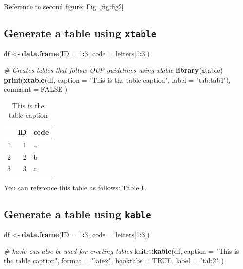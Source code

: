 \documentclass[12pt,halfline,a4paper,]{ouparticle}
\newenvironment{Shaded}{\begin{snugshade}}{\end{snugshade}}
\newcommand{\AttributeTok}[1]{\textcolor[rgb]{0.13,0.29,0.53}{#1}}
\newcommand{\CommentTok}[1]{\textcolor[rgb]{0.56,0.35,0.01}{\textit{#1}}}
\newcommand{\ConstantTok}[1]{\textcolor[rgb]{0.56,0.35,0.01}{#1}}
\newcommand{\DecValTok}[1]{\textcolor[rgb]{0.00,0.00,0.81}{#1}}
\newcommand{\FunctionTok}[1]{\textcolor[rgb]{0.13,0.29,0.53}{\textbf{#1}}}
\newcommand{\NormalTok}[1]{#1}
\newcommand{\OtherTok}[1]{\textcolor[rgb]{0.56,0.35,0.01}{#1}}
\newcommand{\SpecialCharTok}[1]{\textcolor[rgb]{0.81,0.36,0.00}{\textbf{#1}}}
\newcommand{\StringTok}[1]{\textcolor[rgb]{0.31,0.60,0.02}{#1}}
\begin{document}
Reference to second figure: Fig. \ref{fig:fig2}

\subsection{\texorpdfstring{Generate a table using
\texttt{xtable}}{Generate a table using xtable}}\label{generate-a-table-using-xtable}

\begin{Shaded}
\begin{Highlighting}[]
\NormalTok{df }\OtherTok{\textless{}{-}} \FunctionTok{data.frame}\NormalTok{(}\AttributeTok{ID =} \DecValTok{1}\SpecialCharTok{:}\DecValTok{3}\NormalTok{, }\AttributeTok{code =}\NormalTok{ letters[}\DecValTok{1}\SpecialCharTok{:}\DecValTok{3}\NormalTok{])}

\CommentTok{\# Creates tables that follow OUP guidelines using xtable}
\FunctionTok{library}\NormalTok{(xtable)}
\FunctionTok{print}\NormalTok{(}\FunctionTok{xtable}\NormalTok{(df, }\AttributeTok{caption =} \StringTok{"This is the table caption"}\NormalTok{, }\AttributeTok{label =} \StringTok{"tab:tab1"}\NormalTok{),}
  \AttributeTok{comment =} \ConstantTok{FALSE}
\NormalTok{)}
\end{Highlighting}
\end{Shaded}

\begin{table}[ht]
\centering
\begin{tabular}{rrl}
  \hline
 & ID & code \\ 
  \hline
1 &   1 & a \\ 
  2 &   2 & b \\ 
  3 &   3 & c \\ 
   \hline
\end{tabular}
\caption{This is the table caption} 
\label{tab:tab1}
\end{table}

You can reference this table as follows: Table \ref{tab:tab1}.

\subsection{\texorpdfstring{Generate a table using
\texttt{kable}}{Generate a table using kable}}\label{generate-a-table-using-kable}

\begin{Shaded}
\begin{Highlighting}[]
\NormalTok{df }\OtherTok{\textless{}{-}} \FunctionTok{data.frame}\NormalTok{(}\AttributeTok{ID =} \DecValTok{1}\SpecialCharTok{:}\DecValTok{3}\NormalTok{, }\AttributeTok{code =}\NormalTok{ letters[}\DecValTok{1}\SpecialCharTok{:}\DecValTok{3}\NormalTok{])}

\CommentTok{\# kable can alse be used for creating tables}
\NormalTok{knitr}\SpecialCharTok{::}\FunctionTok{kable}\NormalTok{(df,}
  \AttributeTok{caption =} \StringTok{"This is the table caption"}\NormalTok{, }\AttributeTok{format =} \StringTok{"latex"}\NormalTok{,}
  \AttributeTok{booktabs =} \ConstantTok{TRUE}\NormalTok{, }\AttributeTok{label =} \StringTok{"tab2"}
\NormalTok{)}
\end{Highlighting}
\end{Shaded}
\end{document}
